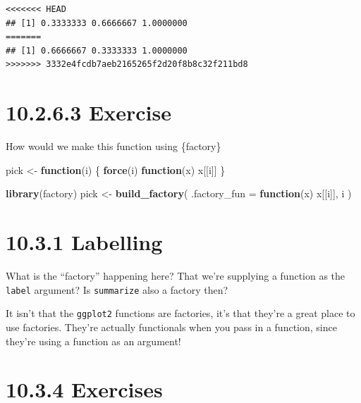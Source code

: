\documentclass[]{book}
\newenvironment{Shaded}{\begin{snugshade}}{\end{snugshade}}
\newcommand{\ControlFlowTok}[1]{\textcolor[rgb]{0.13,0.29,0.53}{\textbf{#1}}}
\newcommand{\DataTypeTok}[1]{\textcolor[rgb]{0.13,0.29,0.53}{#1}}
\newcommand{\KeywordTok}[1]{\textcolor[rgb]{0.13,0.29,0.53}{\textbf{#1}}}
\newcommand{\NormalTok}[1]{#1}
\newcommand{\StringTok}[1]{\textcolor[rgb]{0.31,0.60,0.02}{#1}}
\begin{document}
\begin{verbatim}
<<<<<<< HEAD
## [1] 0.3333333 0.6666667 1.0000000
=======
## [1] 0.6666667 0.3333333 1.0000000
>>>>>>> 3332e4fcdb7aeb2165265f2d20f8b8c32f211bd8
\end{verbatim}

\hypertarget{exercise-14}{%
\section*{10.2.6.3 Exercise}\label{exercise-14}}

How would we make this function using \{factory\}

\begin{Shaded}
\begin{Highlighting}[]
\NormalTok{pick <-}\StringTok{ }\ControlFlowTok{function}\NormalTok{(i) \{}
  \KeywordTok{force}\NormalTok{(i)}
  \ControlFlowTok{function}\NormalTok{(x) x[[i]]}
\NormalTok{\}}
\end{Highlighting}
\end{Shaded}

\begin{Shaded}
\begin{Highlighting}[]
\KeywordTok{library}\NormalTok{(factory)}
\NormalTok{pick <-}\StringTok{ }\KeywordTok{build_factory}\NormalTok{(}
  \DataTypeTok{.factory_fun =} \ControlFlowTok{function}\NormalTok{(x) x[[i]],}
\NormalTok{  i}
\NormalTok{)}
\end{Highlighting}
\end{Shaded}

\hypertarget{labelling}{%
\section*{10.3.1 Labelling}\label{labelling}}

What is the ``factory'' happening here? That we're supplying a function as the \texttt{label} argument? Is \texttt{summarize} also a factory then?

It isn't that the \texttt{ggplot2} functions are factories, it's that they're a great place to use factories. They're actually functionals when you pass in a function, since they're using a function as an argument!

\hypertarget{exercises-8}{%
\section*{10.3.4 Exercises}\label{exercises-8}}
\end{document}
